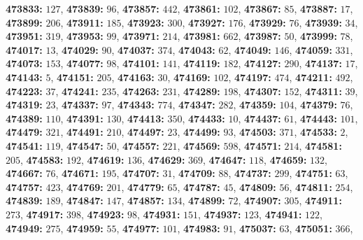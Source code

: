 \textsf{\bfseries 473833:} $127$, \textsf{\bfseries 473839:} $96$, \textsf{\bfseries 473857:} $442$, \textsf{\bfseries 473861:} $102$, \textsf{\bfseries 473867:} $85$, \textsf{\bfseries 473887:} $17$, \textsf{\bfseries 473899:} $206$, \textsf{\bfseries 473911:} $185$, \textsf{\bfseries 473923:} $300$, \textsf{\bfseries 473927:} $176$, \textsf{\bfseries 473929:} $76$, \textsf{\bfseries 473939:} $34$, \textsf{\bfseries 473951:} $319$, \textsf{\bfseries 473953:} $99$, \textsf{\bfseries 473971:} $214$, \textsf{\bfseries 473981:} $662$, \textsf{\bfseries 473987:} $50$, \textsf{\bfseries 473999:} $78$, \textsf{\bfseries 474017:} $13$, \textsf{\bfseries 474029:} $90$, \textsf{\bfseries 474037:} $374$, \textsf{\bfseries 474043:} $62$, \textsf{\bfseries 474049:} $146$, \textsf{\bfseries 474059:} $331$, \textsf{\bfseries 474073:} $153$, \textsf{\bfseries 474077:} $98$, \textsf{\bfseries 474101:} $141$, \textsf{\bfseries 474119:} $182$, \textsf{\bfseries 474127:} $290$, \textsf{\bfseries 474137:} $17$, \textsf{\bfseries 474143:} $5$, \textsf{\bfseries 474151:} $205$, \textsf{\bfseries 474163:} $30$, \textsf{\bfseries 474169:} $102$, \textsf{\bfseries 474197:} $474$, \textsf{\bfseries 474211:} $492$, \textsf{\bfseries 474223:} $37$, \textsf{\bfseries 474241:} $235$, \textsf{\bfseries 474263:} $231$, \textsf{\bfseries 474289:} $198$, \textsf{\bfseries 474307:} $152$, \textsf{\bfseries 474311:} $39$, \textsf{\bfseries 474319:} $23$, \textsf{\bfseries 474337:} $97$, \textsf{\bfseries 474343:} $774$, \textsf{\bfseries 474347:} $282$, \textsf{\bfseries 474359:} $104$, \textsf{\bfseries 474379:} $76$, \textsf{\bfseries 474389:} $110$, \textsf{\bfseries 474391:} $130$, \textsf{\bfseries 474413:} $350$, \textsf{\bfseries 474433:} $10$, \textsf{\bfseries 474437:} $61$, \textsf{\bfseries 474443:} $101$, \textsf{\bfseries 474479:} $321$, \textsf{\bfseries 474491:} $210$, \textsf{\bfseries 474497:} $23$, \textsf{\bfseries 474499:} $93$, \textsf{\bfseries 474503:} $371$, \textsf{\bfseries 474533:} $2$, \textsf{\bfseries 474541:} $119$, \textsf{\bfseries 474547:} $50$, \textsf{\bfseries 474557:} $221$, \textsf{\bfseries 474569:} $598$, \textsf{\bfseries 474571:} $214$, \textsf{\bfseries 474581:} $205$, \textsf{\bfseries 474583:} $192$, \textsf{\bfseries 474619:} $136$, \textsf{\bfseries 474629:} $369$, \textsf{\bfseries 474647:} $118$, \textsf{\bfseries 474659:} $132$, \textsf{\bfseries 474667:} $76$, \textsf{\bfseries 474671:} $195$, \textsf{\bfseries 474707:} $31$, \textsf{\bfseries 474709:} $88$, \textsf{\bfseries 474737:} $299$, \textsf{\bfseries 474751:} $63$, \textsf{\bfseries 474757:} $423$, \textsf{\bfseries 474769:} $201$, \textsf{\bfseries 474779:} $65$, \textsf{\bfseries 474787:} $45$, \textsf{\bfseries 474809:} $56$, \textsf{\bfseries 474811:} $254$, \textsf{\bfseries 474839:} $189$, \textsf{\bfseries 474847:} $147$, \textsf{\bfseries 474857:} $134$, \textsf{\bfseries 474899:} $72$, \textsf{\bfseries 474907:} $305$, \textsf{\bfseries 474911:} $273$, \textsf{\bfseries 474917:} $398$, \textsf{\bfseries 474923:} $98$, \textsf{\bfseries 474931:} $151$, \textsf{\bfseries 474937:} $123$, \textsf{\bfseries 474941:} $122$, \textsf{\bfseries 474949:} $275$, \textsf{\bfseries 474959:} $55$, \textsf{\bfseries 474977:} $101$, \textsf{\bfseries 474983:} $91$, \textsf{\bfseries 475037:} $63$, \textsf{\bfseries 475051:} $366$, 
